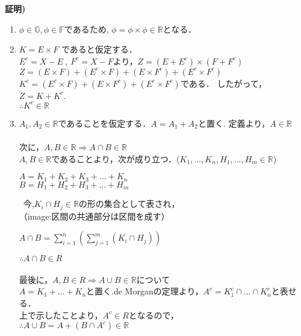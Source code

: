 \documentclass[11pt, a4paper, dvipdfmx]{jsarticle}
\theoremstyle{definition}
\renewcommand{\proofname}{\bfseries Proof}
\renewcommand{\proofname}{\bfseries 証明}
\begin{document}
\proofname)
\begin{enumerate}
\renewcommand{\labelenumi}{(\roman{enumi})}
\item $\phi \in \mathbb{G},\phi \in \mathbb{F}$であるため,
$\phi = \phi \times \phi \in \mathbb{R}$となる．

\item $K = E \times F $ であると仮定する．\\
$E^{c} = X-E~,~F^{c} = X - F$より，$Z = (E+E^{c}) \times (F+F^{c})$\\
$Z = (E \times F)+(E^{c} \times F)+(E \times F^{c})+(E^{c} \times F^{c})$\\
$K^{c} = (E^{c}\times F)+(E \times F^{c})+(E^{c} \times F^{c})$である．
したがって，$Z = K + K^{c} $. \\$\therefore K^{c} \in \mathbb{R}$
\\
\item$A_1,A_2 \in \mathbb{R}$であることを仮定する．$A = A_1+A_2$と置く.
定義より，$A \in \mathbb{R}$\\
\\
次に，$A,B \in \mathbb{R} \Rightarrow A\cap B \in \mathbb{R}$\\
$A,B \in \mathbb{R}$であることより，次が成り立つ．($K_1,...,K_n,H_1,...,H_m  \in \mathbb{R}$)
\begin{center}
  $A = K_1+K_2+K_3+...+K_n$ \\
  $B = H_1+H_2+H_3+...+H_m$
\end{center}
 今,$K_i\cap H_j\in \mathbb{R}$の形の集合として表され，\\
（image:区間の共通部分は区間を成す）
\begin{center}
  $A \cap B = \sum^{n}_{i=1}(\sum^{m}_{j=1}(K_i \cap H_j))$
\end{center}
$\therefore A\cap B \in R$\\
\\
最後に，$A,B\in R \Rightarrow A\cup B \in \mathbb{R}$について\\
$A = K_1+...+K_n$と置く.de Morganの定理より，$A^{c}= K_1^{c}\cap ... \cap K_n^{c}$と表せる．\\
上で示したことより，$A^{c} \in R$となるので，\\
$\therefore A\cup B = A+(B \cap A^{c}) \in \mathbb{R}$

\end{enumerate}
\end{document}

